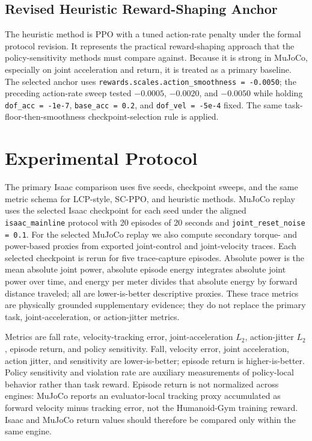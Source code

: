 \documentclass[10pt]{article}
\newcommand{\jacc}{joint-acceleration}
\begin{document}
\subsection{Revised Heuristic Reward-Shaping Anchor}

The heuristic method is PPO with a tuned action-rate penalty under the formal
protocol revision. It represents the practical reward-shaping approach that the
policy-sensitivity methods must compare against. Because it is strong in MuJoCo,
especially on joint acceleration and return, it is treated as a primary
baseline. The selected anchor uses
\texttt{rewards.scales.action\_smoothness = -0.0050}; the preceding
action-rate sweep tested $-0.0005$, $-0.0020$, and $-0.0050$ while holding
\texttt{dof\_acc = -1e-7}, \texttt{base\_acc = 0.2}, and
\texttt{dof\_vel = -5e-4} fixed. The same task-floor-then-smoothness
checkpoint-selection rule is applied.

\section{Experimental Protocol}

The primary Isaac comparison uses five seeds, checkpoint sweeps, and the same
metric schema for LCP-style, SC-PPO, and heuristic methods. MuJoCo replay uses the
selected Isaac checkpoint for each seed under the aligned \texttt{isaac\_mainline}
protocol with 20 episodes of 20 seconds and \texttt{joint\_reset\_noise = 0.1}.
For the selected MuJoCo replay we also compute secondary torque- and
power-based proxies from exported joint-control and joint-velocity traces.
Each selected checkpoint is rerun for five trace-capture episodes.
Absolute power is the mean absolute joint power, absolute episode energy
integrates absolute joint power over time, and energy per meter divides that
absolute energy by forward distance traveled; all are lower-is-better
descriptive proxies. These trace metrics are physically grounded supplementary
evidence; they do not replace the primary task, \jacc, or action-jitter
metrics.

Metrics are fall rate, velocity-tracking error, joint-acceleration $L_2$,
action-jitter $L_2$, episode return, and policy sensitivity. Fall, velocity
error, joint acceleration, action jitter, and sensitivity are lower-is-better;
episode return is higher-is-better. Policy sensitivity and violation rate are
auxiliary measurements of policy-local behavior rather than task reward.
Episode return is not normalized across engines: MuJoCo reports an
evaluator-local tracking proxy accumulated as forward velocity minus tracking
error, not the Humanoid-Gym training reward. Isaac and MuJoCo return values
should therefore be compared only within the same engine.
\end{document}
